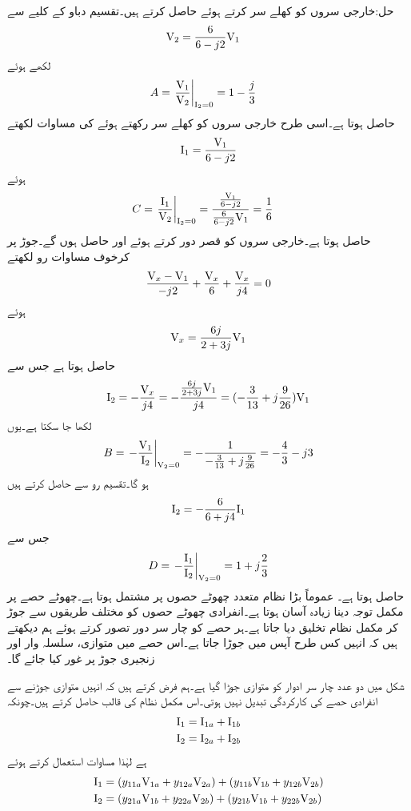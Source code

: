 حل:خارجی سروں کو کھلے سر کرتے ہوئے  حاصل کرتے ہیں۔تقسیم دباو کے کلیے سے
\begin{align*}
{\ensuremath{{\textup{V}}}}_2&=\frac{6}{6-j2}{{\textup{V}}}_1
\end{align*}
لکھے ہوئے 
\begin{align*}
A&=\left.\frac{{{\textup{V}}}_1}{{{\textup{V}}}_2} \right|_{{{\textup{I}}}_2=0}=1-\frac{j}{3}
\end{align*}
حاصل ہوتا ہے۔اسی طرح  خارجی سروں کو کھلے سر رکھتے ہوئے  کی مساوات لکھتے
\begin{align*}
{\ensuremath{{\textup{I}}}}_1=\frac{{{\textup{V}}}_1}{6-j2}
\end{align*} 
ہوئے
\begin{align*}
C&=\left.\frac{{{\textup{I}}}_1}{{{\textup{V}}}_2} \right|_{{{\textup{I}}}_2=0}=\frac{\frac{{{\textup{V}}}_1}{6-j2}}{\frac{6}{6-j2}{{\textup{V}}}_1}=\frac{1}{6}
\end{align*}
حاصل ہوتا ہے۔خارجی سروں کو قصر دور کرتے ہوئے  اور  حاصل ہوں گے۔جوڑ  پر کرخوف مساوات رو لکھتے
\begin{align*}
\frac{{{\textup{V}}}_x-{{\textup{V}}}_1}{-j2}+\frac{{{\textup{V}}}_x}{6}+\frac{{{\textup{V}}}_x}{j4}=0
\end{align*}
ہوئے
\begin{align*}
{\ensuremath{{\textup{V}}}}_x=\frac{6j}{2+3j}{{\textup{V}}}_1
\end{align*}
حاصل ہوتا ہے جس سے 
\begin{align*}
{\ensuremath{{\textup{I}}}}_2=-\frac{{{\textup{V}}}_x}{j4}=-\frac{\frac{6j}{2+3j}{{\textup{V}}}_1}{j4}=(-\frac{3}{13}+j\frac{9}{26}){{\textup{V}}}_1
\end{align*}
لکھا جا سکتا ہے۔یوں
\begin{align*}
B=\left. -\frac{{{\textup{V}}}_1}{{{\textup{I}}}_2}\right|_{{{\textup{V}}}_2=0}=-\frac{1}{-\frac{3}{13}+j\frac{9}{26}}=-\frac{4}{3}-j3
\end{align*}
ہو گا۔تقسیم رو سے  حاصل کرتے ہیں
\begin{align*}
{\ensuremath{{\textup{I}}}}_2=-\frac{6}{6+j4}{{\textup{I}}}_1
\end{align*}
جس سے 
\begin{align*}
D=\left. -\frac{{{\textup{I}}}_1}{{{\textup{I}}}_2}\right|_{{{\textup{V}}}_2=0}=1+j\frac{2}{3}
\end{align*}
حاصل ہوتا ہے۔
عموماً بڑا نظام متعدد چھوٹے حصوں پر مشتمل ہوتا ہے۔چھوٹے حصے پر مکمل توجہ دینا زیادہ آسان ہوتا ہے۔انفرادی چھوٹے حصوں کو مختلف طریقوں سے جوڑ کر مکمل نظام تخلیق دیا جاتا ہے۔ہر حصے کو چار سر دور تصور  کرتے ہوئے ہم دیکھتے ہیں کہ انہیں کس طرح آپس میں جوڑا جاتا ہے۔اس حصے میں متوازی، سلسلہ وار اور زنجیری جوڑ پر غور کیا جائے گا۔

شکل  میں دو عدد چار سر ادوار کو متوازی جوڑا گیا ہے۔ہم فرض کرتے ہیں کہ انہیں متوازی جوڑنے سے انفرادی حصے کی کارکردگی تبدیل نہیں ہوتی۔اس مکمل نظام کی  قالب حاصل کرتے ہیں۔چونکہ
\begin{align*}
{\ensuremath{{\textup{I}}}}_1&={{\textup{I}}}_{1a}+{{\textup{I}}}_{1b}\\
{{\textup{I}}}_2&={{\textup{I}}}_{2a}+{{\textup{I}}}_{2b}
\end{align*}
ہے لہٰذا مساوات  استعمال کرتے ہوئے
\begin{align*}
{\ensuremath{{\textup{I}}}}_1&=(y_{11a}{{\textup{V}}}_{1a}+y_{12a}{{\textup{V}}}_{2a})+(y_{11b}{{\textup{V}}}_{1b}+y_{12b}{{\textup{V}}}_{2b})\\
{{\textup{I}}}_2&=(y_{21a}{{\textup{V}}}_{1b}+y_{22a}{{\textup{V}}}_{2b})+(y_{21b}{{\textup{V}}}_{1b}+y_{22b}{{\textup{V}}}_{2b})
\end{align*}

